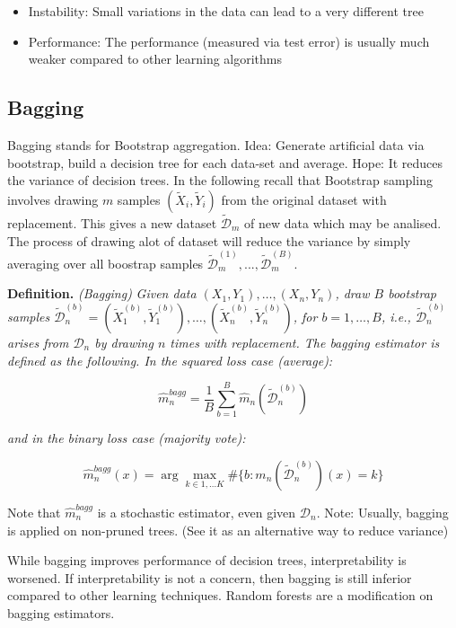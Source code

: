 \documentclass[
]{book}
\providecommand{\tightlist}{%
  \setlength{\itemsep}{0pt}\setlength{\parskip}{0pt}}
\begin{document}
\begin{itemize}
\tightlist
\item
  Instability: Small variations in the data can lead to a very different tree
\item
  Performance: The performance (measured via test error) is usually much weaker compared to other learning algorithms
\end{itemize}

\hypertarget{bagging}{%
\subsection{Bagging}\label{bagging}}

Bagging stands for Bootstrap aggregation. Idea: Generate artificial data via bootstrap, build a decision tree for each data-set and average. Hope: It reduces the variance of decision trees. In the following recall that Bootstrap sampling involves drawing \(m\) samples \((\tilde X_i,\tilde Y_i)\) from the original dataset with replacement. This gives a new dataset \(\tilde {\mathcal D}_m\) of new data which may be analised. The process of drawing alot of dataset will reduce the variance by simply averaging over all boostrap samples \(\tilde {\mathcal D}_m^{(1)},...,\tilde {\mathcal D}_m^{(B)}\).

\textbf{Definition.} \emph{(Bagging)} \emph{Given data \({(X_1,Y_1),\dots, (X_n,Y_n)}\), draw \(B\) bootstrap samples \(\tilde {\mathcal D}^{(b)}_n={(\tilde X^{(b)}_1,\tilde Y^{(b)}_1),\dots, (\tilde X^{(b)}_n,\tilde Y^{(b)}_n)}\), for \(b=1,\dots, B\), i.e., \(\tilde {\mathcal D}^{(b)}_n\) arises from \(\mathcal D_n\) by drawing \(n\) times with replacement. The bagging estimator is defined as the following. In the squared loss case (average):}

\[
\hat m^{bagg}_n=\frac 1 B \sum_{b=1}^B \hat m_n(\tilde {\mathcal D}^{(b)}_n)
\]

\emph{and in the binary loss case (majority vote):}

\[
\hat m^{bagg}_n(x)=\arg \max_{k\in {1,\dots K}} \#\{b: m_n(\tilde {\mathcal D}^{(b)}_n) (x)=k\}
\]

Note that \(\hat m^{bagg}_n\) is a stochastic estimator, even given \(\mathcal D_n\). Note: Usually, bagging is applied on non-pruned trees. (See it as an alternative way to reduce variance)

While bagging improves performance of decision trees, interpretability is worsened. If interpretability is not a concern, then bagging is still inferior compared to other learning techniques. Random forests are a modification on bagging estimators.
\end{document}
